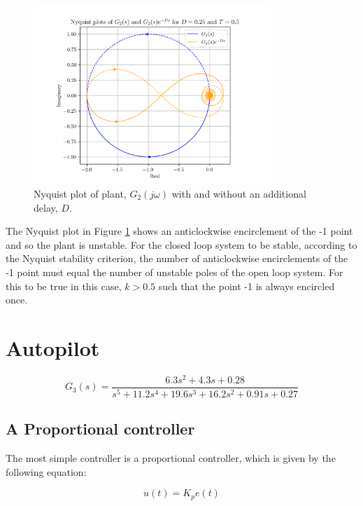 \documentclass[8pt]{article}
\begin{document}
\begin{figure}[H]
    \centering
    \includegraphics[width=0.8\textwidth]{figures/nyquist2.png}
    \caption{Nyquist plot of plant, $G_2(j\omega)$ with and without an additional delay, $D$.}
    \label{fig:nyquist2}
\end{figure}

The Nyquist plot in Figure \ref{fig:nyquist2} shows an anticlockwise encirclement of the -1 point and so the plant is unstable.
For the closed loop system to be stable, according to the Nyquist stability criterion, the number of anticlockwise encirclements of the -1 point must equal the number of unstable poles of the open loop system.
For this to be true in this case, $k>0.5$ such that the point -1 is always encircled once.

\section{Autopilot}

\begin{equation}
    G_3(s) = \frac{6.3s^2 + 4.3s + 0.28}{s^5 + 11.2s^4 + 19.6s^3 + 16.2s^2 + 0.91s + 0.27}
\end{equation}

\subsection{A Proportional controller}

The most simple controller is a proportional controller, which is given by the following equation:

\begin{equation}
    u(t) = K_p e(t)
\end{equation}
\end{document}
